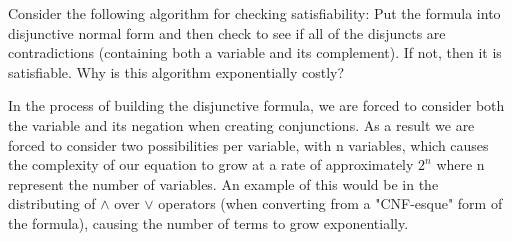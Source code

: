 \documentclass[solution,letterpaper]{cs20}
\begin{document}
\begin{problem}
    Consider the following algorithm for checking satisfiability: Put the formula into disjunctive normal form and then check to see if all of the disjuncts are contradictions (containing both a variable and its complement). If not, then it is satisfiable. Why is this algorithm exponentially costly?
    \begin{solution}
        In the process of building the disjunctive formula, we are forced to consider both the variable and its negation when creating conjunctions. As a result we are forced to consider two possibilities per variable, with n variables, which causes the complexity of our equation to grow at a rate of approximately $2^n$ where n represent the number of variables. An example of this would be in the distributing of $\land$ over $\lor$ operators (when converting from a "CNF-esque" form of the formula), causing the number of terms to grow exponentially.
    \end{solution}
\end{problem}
\end{document}

